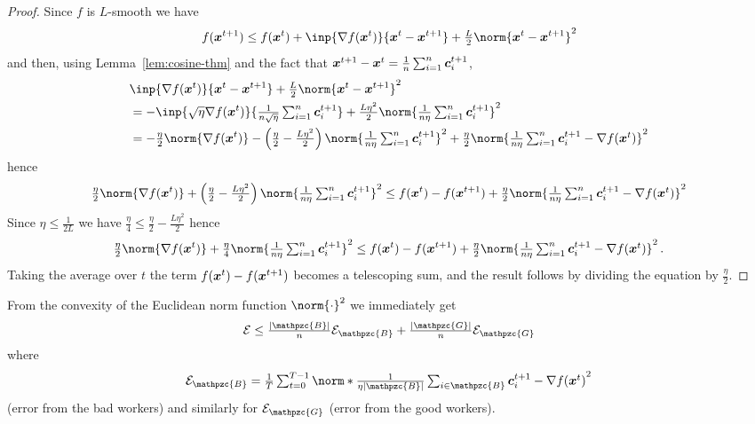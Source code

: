 \documentclass{article}
\newcommand{\gset}{\ensuremath{{\mathpzc{G}}}}
\newcommand{\bset}{\ensuremath{{\mathpzc{B}}}}
\begin{document}
\begin{proof}
  Since $f$ is $L$-smooth we have
  \[
    f(\xx^{t+1}) \le f(\xx^t) + \inp{\nabla f(\xx^t)}{\xx^t - \xx^{t+1}} + \tfrac{L}{2} \norm{\xx^t - \xx^{t+1}}^2
  \]
  and then, using Lemma~\ref{lem:cosine-thm} and the fact that $\bm{x}^{t+1} - \bm{x}^t = \tfrac{1}{n} \textstyle\sum_{i=1}^n \bm{c}_i^{t+1}$,
  \begin{align*}
    &\inp{\nabla f(\xx^t)}{\xx^t - \xx^{t+1}} + \tfrac{L}{2} \norm{\xx^t - \xx^{t+1}}^2 
    \\
    &=
    -\inp{\sqrt{\eta} \nabla f(\xx^t)}{\tfrac{1}{n\sqrt\eta} \tsum_{i=1}^n \cc_i^{t+1}} + \tfrac{L \eta^2}{2} \norm{\tfrac{1}{n\eta} \tsum_{i=1}^n \cc_i^{t+1}}^2
    \\
    &= -\tfrac{\eta}{2} \norm{\nabla f(\xx^t)} - \left( \tfrac{\eta}{2} - \tfrac{L\eta^2}{2}\right) \norm{\tfrac{1}{n\eta} \tsum_{i=1}^n \cc_i^{t+1}}^2 + \tfrac{\eta}{2} \norm{\tfrac{1}{n\eta} \tsum_{i=1}^n \cc_i^{t+1} - \nabla f(\xx^t)}^2
  \end{align*}
  hence
  \[
    \tfrac{\eta}{2} \norm{\nabla f(\xx^t)} 
    + \left( \tfrac{\eta}{2} - \tfrac{L\eta^2}{2}\right) \norm{\tfrac{1}{n\eta} \tsum_{i=1}^n \cc_i^{t+1}}^2 
    \le 
   f(\xx^t) - f(\xx^{t+1}) 
   + \tfrac{\eta}{2} \norm{\tfrac{1}{n\eta} \tsum_{i=1}^n \cc_i^{t+1} - \nabla f(\xx^t)}^2
  \]
  Since $\eta \le \tfrac{1}{2L}$ we have $\tfrac{\eta}{4} \le \tfrac{\eta}{2} - \tfrac{L\eta^2}{2}$ hence
  \[
    \tfrac{\eta}{2} \norm{\nabla f(\xx^t)} 
    + \tfrac{\eta}{4} \norm{\tfrac{1}{n\eta} \tsum_{i=1}^n \cc_i^{t+1}}^2 
    \le 
   f(\xx^t) - f(\xx^{t+1}) 
   + \tfrac{\eta}{2} \norm{\tfrac{1}{n\eta} \tsum_{i=1}^n \cc_i^{t+1} - \nabla f(\xx^t)}^2 \, .
  \]
  Taking the average over $t$ the term $f(\bm{x}^t) - f(\bm{x}^{t+1})$ becomes a telescoping sum, and the result follows by dividing the equation by $\tfrac{\eta}{2}$.
\end{proof}

  
\begin{lemma}\label{lem:error-decomposition}
  From the convexity of the Euclidean norm function $\norm{\cdot}^2$ we immediately get
  \begin{align*}
    \mathcal E
     \le 
    \tfrac{|\bset|}{n} \cE_\bset
     + 
    \tfrac{|\gset|}{n} \cE_\gset
  \end{align*}
  where 
  \[
    \cE_\bset = \tfrac{1}{T} \tsum_{t=0}^{T-1} \norm*{\tfrac{1}{\eta |\bset|} \tsum_{i\in\bset} \cc_i^{t+1} - \nabla f(\xx^t)}^2
  \]
  (error from the bad workers) and similarly for $\cE_\gset$ (error from the good workers).
\end{lemma}
\end{document}
